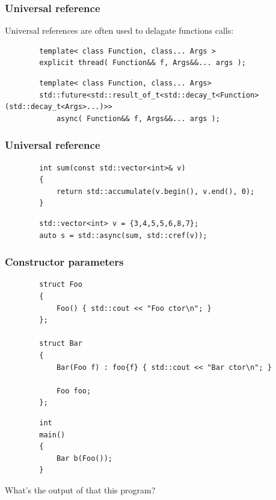 \documentclass{beamer}
\begin{document}
\begin{frame}[fragile]
\frametitle{Universal reference}
    Universal references are often used to delagate functions calls:
    \pause
    \begin{lstlisting}
        template< class Function, class... Args >
        explicit thread( Function&& f, Args&&... args );
    \end{lstlisting}
    \pause
    \begin{lstlisting}
        template< class Function, class... Args>
        std::future<std::result_of_t<std::decay_t<Function>(std::decay_t<Args>...)>>
            async( Function&& f, Args&&... args );
    \end{lstlisting}
\end{frame}

\begin{frame}[fragile]
\frametitle{Universal reference}
    \begin{lstlisting}
        int sum(const std::vector<int>& v)
        {
            return std::accumulate(v.begin(), v.end(), 0);
        }
    \end{lstlisting}

    \begin{lstlisting}
        std::vector<int> v = {3,4,5,5,6,8,7};
        auto s = std::async(sum, std::cref(v));
    \end{lstlisting}
\end{frame}

\begin{frame}[fragile,t]
\frametitle{Constructor parameters}
    \begin{lstlisting}
        struct Foo
        {
            Foo() { std::cout << "Foo ctor\n"; }
        };

        struct Bar
        {
            Bar(Foo f) : foo{f} { std::cout << "Bar ctor\n"; }

            Foo foo;
        };
    \end{lstlisting}
    \hrulefill
    \begin{lstlisting}
        int
        main()
        {
            Bar b(Foo());
        }
    \end{lstlisting}

    What's the output of that this program?
\end{frame}
\end{document}

